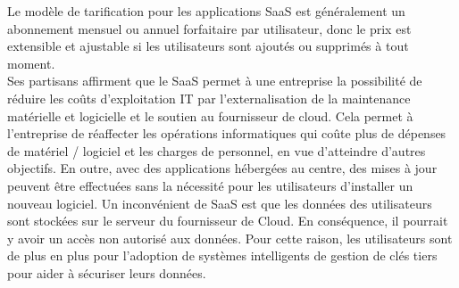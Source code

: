 \begin{itemize}
                Le modèle de tarification pour les applications SaaS est généralement un abonnement mensuel ou annuel forfaitaire par utilisateur,  donc le prix est extensible et ajustable si les utilisateurs sont ajoutés ou supprimés à tout moment.\\

                Ses partisans affirment que le  SaaS permet à une entreprise la possibilité de réduire les coûts d'exploitation IT par l'externalisation de la maintenance matérielle et logicielle et le soutien au fournisseur de cloud. Cela permet à l'entreprise de réaffecter les opérations informatiques qui coûte plus de dépenses de matériel / logiciel et les charges de personnel, en vue d'atteindre d'autres objectifs. En outre, avec des applications hébergées au centre, des mises à jour peuvent être effectuées sans la nécessité pour les utilisateurs d'installer un nouveau logiciel. Un inconvénient de SaaS est que les données des utilisateurs sont stockées sur le serveur du fournisseur de Cloud. En conséquence, il pourrait y avoir un accès non autorisé aux données. Pour cette raison, les utilisateurs sont de plus en plus pour l'adoption de systèmes intelligents de gestion de clés tiers pour aider à sécuriser leurs données.\\
            \end{itemize}

